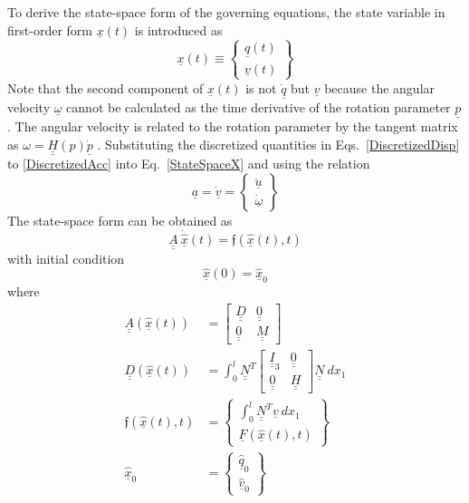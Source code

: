 \documentclass{aiaa-tc}
\newcommand{\tens}[1]{\underline{\underline{#1}}}
\renewcommand{\vec}[1]{\underline{#1}}
\begin{document}
To derive the state-space form of the governing equations, the state variable in first-order form $\vec{x}(t)$ is introduced as
\begin{equation}
    \label{StateSpaceX}
    \vec{x}(t) \equiv \begin{Bmatrix}
    \vec{q}(t) \\
    \vec{v}(t)
    \end{Bmatrix} 
\end{equation}
Note that the second component of $\vec{x}(t)$ is not $\vec{\dot{q}}$ but $\vec{v}$ because the angular velocity $\vec{\omega}$ cannot be calculated as the time derivative of the rotation parameter $\vec{p}$. The angular velocity is related to the rotation parameter by the tangent matrix as $\omega = \tens{H}(p) \dot{\vec{p}}$ \cite{Bauchau:2010}. Substituting the discretized quantities in Eqs.~\eqref{DiscretizedDisp} to \eqref{DiscretizedAcc} into Eq.~\eqref{StateSpaceX} and using the relation
\begin{equation}
    \label{AccVel}
    \vec{a} = \vec{\dot{v}} = \begin{Bmatrix}
    \vec{\ddot{u}} \\
    \vec{\dot{\omega}}
    \end{Bmatrix}
\end{equation}
The state-space form can be obtained as
\begin{equation}
    \label{StateSpaceGov-1}
    \tens{A} ~\dot{\hat{\vec{x}}}(t) = \mathfrak{f}(\hat{\vec{x}}(t),t)
\end{equation}
with initial condition
\begin{equation}
    \label{StateSpaceGov-2}
    \hat{\vec{x}}(0) = \hat{\vec{x}}_0
\end{equation}
where
\begin{align}
    \label{StateSpaceGov-3}
    \tens{A} (\hat{\vec{x}}(t)) &= \begin{bmatrix}
    \tens{D} & \tens{0} \\
    \tens{0} & \tens{M}
    \end{bmatrix}  \\
    \label{StateSpaceGov-4}
    \tens{D} (\hat{\vec{x}}(t)) &= \int_0^l \tens{N}^T \begin{bmatrix}
    \tens{I}_3 & \tens{0} \\
    \tens{0} & \tens{H}
    \end{bmatrix} 
    \tens{N}~dx_1 \\
    \label{StateSpaceGov-5}
    \mathfrak{f}(\hat{\vec{x}}(t),t) &=  \begin{Bmatrix}
    \int_0^l \tens{N}^T \vec{v}~dx_1 \\
    \vec{F}(\hat{\vec{x}}(t),t)
    \end{Bmatrix} \\
    \label{StateSpaceGov-7}
    \hat{\vec{x}}_0 &= \begin{Bmatrix}
    \hat{\vec{q}}_0 \\
    \hat{\vec{v}}_0
    \end{Bmatrix}
\end{align}
\end{document}
